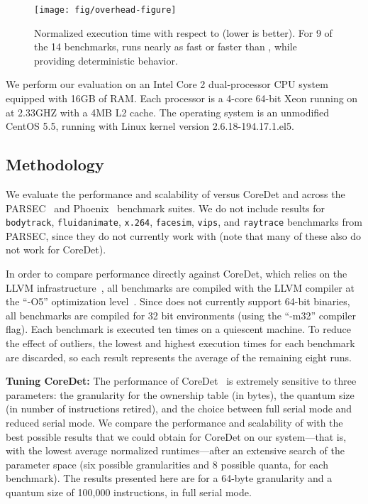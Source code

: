 \label{sec:evaluation}

\begin{figure*}[!t]
{\centering
\texttt{[image: fig/overhead-figure]}
\caption{Normalized execution time with respect to \pthreads{} (lower is better). For 9 of the 14 benchmarks, \dthreads{} runs nearly as fast or faster than \pthreads{}, while providing deterministic behavior.\label{fig:performance}}
}
\end{figure*}



We perform our evaluation on an Intel Core 2 dual-processor CPU system
equipped with 16GB of RAM. Each processor is a 4-core 64-bit Xeon
running on at 2.33GHZ with a 4MB L2 cache.  The operating system is an
unmodified CentOS 5.5, running with Linux kernel version
2.6.18-194.17.1.el5.

\subsection{Methodology}

We evaluate the performance and scalability of \dthreads{} versus
CoreDet and \pthreads{} across the PARSEC~\cite{parsec} and
Phoenix~\cite{phoenix-hpca} benchmark suites.  We do not include
results for \texttt{bodytrack}, \texttt{fluidanimate}, \texttt{x.264},
\texttt{facesim}, \texttt{vips}, and \texttt{raytrace} benchmarks from PARSEC, 
since they do not currently work with \dthreads{} (note that many of
these also do not work for CoreDet).

In order to compare performance directly against CoreDet, which relies
on the LLVM infrastructure~\cite{LLVM:CGO04}, all benchmarks are
compiled with the LLVM compiler at the ``-O5'' optimization
level~\cite{LLVM:CGO04}. Since \dthreads{} does not currently support
64-bit binaries, all benchmarks are compiled for 32 bit environments
(using the ``-m32'' compiler flag). Each benchmark is executed ten
times on a quiescent machine. To reduce the effect of outliers, the
lowest and highest execution times for each benchmark are discarded,
so each result represents the average of the remaining eight runs.

\textbf{Tuning CoreDet: } 
The performance of CoreDet~\cite{Bergan:2010:CCR:1736020.1736029} is
extremely sensitive to three parameters: the granularity for the
ownership table (in bytes), the quantum size (in number of
instructions retired), and the choice between full serial mode and
reduced serial mode. We compare the performance and scalability
of \dthreads{} with the best possible results that we could obtain for
CoreDet on our system---that is, with the lowest average normalized
runtimes---after an extensive search of the parameter space (six
possible granularities and 8 possible quanta, for each benchmark). The
results presented here are for a 64-byte granularity and a quantum
size of 100,000 instructions, in full serial mode.
 
